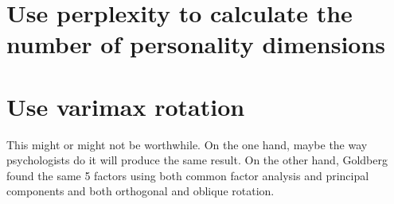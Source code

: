 \documentclass[eric_thesis.tex]{subfiles}
\begin{document}
\section{Use perplexity to calculate the number of personality dimensions}

\section{Use varimax rotation}


This might or might not be worthwhile. On the one hand, maybe the way
psychologists do it will produce the same result. On the other hand,
Goldberg  found the same 5 factors using both common factor
analysis and principal components and both orthogonal and oblique
rotation.
\end{document}
